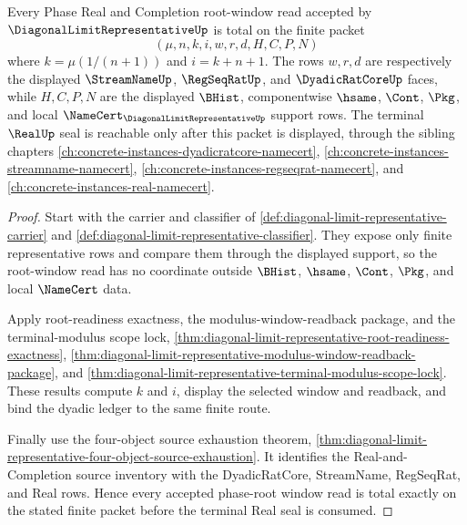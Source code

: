 \begin{theorem}
\label{thm:diagonal-limit-representative-phase-root-window-totality}
Every Phase Real and Completion root-window read accepted by $\DiagonalLimitRepresentativeUp$ is total on the finite packet
$$
(\mu,n,k,i,w,r,d,H,C,P,N)
$$
where $k=\mu(1/(n+1))$ and $i=k+n+1$. The rows $w,r,d$ are respectively the displayed $\StreamNameUp$, $\RegSeqRatUp$, and $\DyadicRatCoreUp$ faces, while $H,C,P,N$ are the displayed $\BHist$, componentwise $\hsame$, $\Cont$, $\Pkg$, and local $\NameCert_{\DiagonalLimitRepresentativeUp}$ support rows. The terminal $\RealUp$ seal is reachable only after this packet is displayed, through the sibling chapters \autoref{ch:concrete-instances-dyadicratcore-namecert}, \autoref{ch:concrete-instances-streamname-namecert}, \autoref{ch:concrete-instances-regseqrat-namecert}, and \autoref{ch:concrete-instances-real-namecert}.
\end{theorem}
\begin{proof}
Start with the carrier and classifier of \autoref{def:diagonal-limit-representative-carrier} and \autoref{def:diagonal-limit-representative-classifier}. They expose only finite representative rows and compare them through the displayed support, so the root-window read has no coordinate outside $\BHist$, $\hsame$, $\Cont$, $\Pkg$, and local $\NameCert$ data.

Apply root-readiness exactness, the modulus-window-readback package, and the terminal-modulus scope lock, \autoref{thm:diagonal-limit-representative-root-readiness-exactness}, \autoref{thm:diagonal-limit-representative-modulus-window-readback-package}, and \autoref{thm:diagonal-limit-representative-terminal-modulus-scope-lock}. These results compute $k$ and $i$, display the selected window and readback, and bind the dyadic ledger to the same finite route.

Finally use the four-object source exhaustion theorem, \autoref{thm:diagonal-limit-representative-four-object-source-exhaustion}. It identifies the Real-and-Completion source inventory with the DyadicRatCore, StreamName, RegSeqRat, and Real rows. Hence every accepted phase-root window read is total exactly on the stated finite packet before the terminal Real seal is consumed.
\end{proof}

